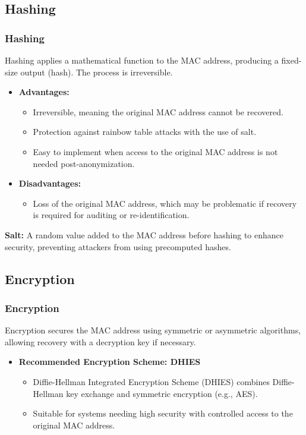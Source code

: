 \documentclass[
english,
svgnames,
notes=hide,
12pt]{beamer}
\begin{document}
\begin{frame}
  \section{Hashing}
  \frametitle{Hashing}
  Hashing applies a mathematical function to the MAC address, producing a fixed-size output (hash). The process is irreversible.
  \begin{itemize}
    \item \textbf{Advantages:} \pause
      \begin{itemize}
        \item Irreversible, meaning the original MAC address cannot be recovered. \pause
        \item Protection against rainbow table attacks with the use of salt. \pause
        \item Easy to implement when access to the original MAC address is not needed post-anonymization. \pause
      \end{itemize}
    \item \textbf{Disadvantages:} \pause
      \begin{itemize}
        \item Loss of the original MAC address, which may be problematic if recovery is required for auditing or re-identification. \pause
      \end{itemize}
  \end{itemize}
  \textbf{Salt:} A random value added to the MAC address before hashing to enhance security, preventing attackers from using precomputed hashes.
\end{frame}

\begin{frame}
  \section{Encryption}
  \frametitle{Encryption}
  Encryption secures the MAC address using symmetric or asymmetric algorithms, allowing recovery with a decryption key if necessary.
  \begin{itemize}
    \item \textbf{Recommended Encryption Scheme: DHIES} \pause
      \begin{itemize}
        \item Diffie-Hellman Integrated Encryption Scheme (DHIES) combines Diffie-Hellman key exchange and symmetric encryption (e.g., AES). \pause
        \item Suitable for systems needing high security with controlled access to the original MAC address.
      \end{itemize}
  \end{itemize}
\end{frame}
\end{document}
